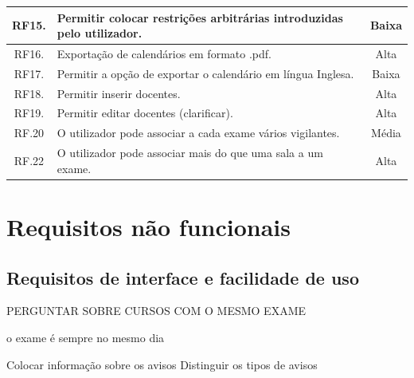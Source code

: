 \documentclass[11pt, twoside]{report}
\begin{document}
\begin{table}
\begin{center}
\begin{tabularx}{\textwidth}{|c|X|c|}
				\hline
				RF15. & Permitir colocar restrições arbitrárias introduzidas pelo utilizador. & Baixa \\
				\hline
				RF16. & Exportação de calendários em formato .pdf. & Alta \\
				\hline
				RF17. & Permitir a opção de exportar o calendário em língua Inglesa. & Baixa \\
				\hline
				RF18. & Permitir inserir docentes. & Alta\\
				\hline
				RF19. & Permitir editar docentes (clarificar). & Alta\\
				\hline
				RF.20 & O utilizador pode associar a cada exame vários vigilantes. & Média\\
				\hline
				RF.22 &	O utilizador pode associar mais do que uma sala a um exame. & Alta\\
				\hline
			\end{tabularx}
	\end{center}
\end{table}

	
	\section{Requisitos não funcionais}
	\subsection{Requisitos de interface e facilidade de uso}
	PERGUNTAR SOBRE CURSOS COM O MESMO EXAME
	
	o exame é sempre no mesmo dia
	
	
	Colocar informação sobre os avisos
	Distinguir os tipos de avisos
	
	
	
\end{document}
